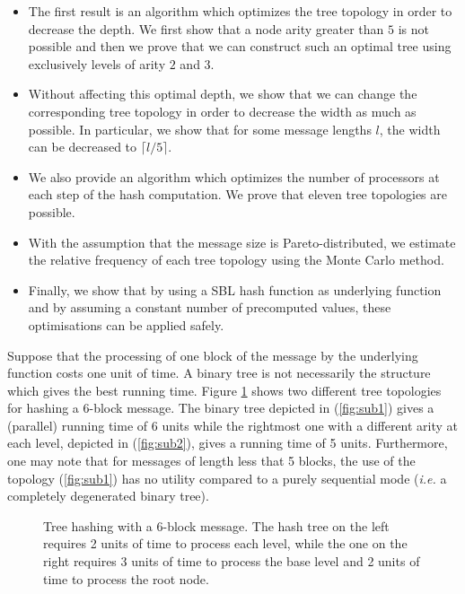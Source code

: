 \documentclass{llncs}
\begin{document}
\begin{itemize}
 \item The first result is an algorithm which optimizes 
the tree topology in order to decrease the depth. We first show that a node arity greater than $5$ is not possible and then we prove
that we can construct such an optimal tree using exclusively levels of arity $2$ and $3$.
 \item Without affecting this optimal depth, 
we show that we can change the corresponding tree topology in order to decrease the width as much as possible. 
In particular, we show that for some message lengths $l$, the width can be decreased to $\lceil l/5 \rceil$.
\item We also provide an algorithm which optimizes the number of processors 
 at each step of the hash computation. We prove that eleven tree topologies are possible.
 \item With the assumption that the message size is Pareto-distributed, we estimate the relative frequency of each tree topology 
 using the Monte Carlo method.
 \item Finally, we show that by using a SBL hash function as underlying function and by assuming a constant number of precomputed values, 
 these optimisations can be applied safely.
\end{itemize}



Suppose that the processing of one block of the message by the underlying function costs one unit of time. 
A binary tree is not necessarily the structure which gives the best running time. Figure \ref{Arbre_exemple} shows two different tree topologies for
hashing a 6-block message. 
The binary tree depicted in (\ref{fig:sub1}) gives a (parallel) running time of $6$ units while the rightmost one with a different arity 
at each level, depicted in (\ref{fig:sub2}), gives a running time of 5 units. Furthermore, one may note that for messages of length less that 5 blocks, 
the use of the topology (\ref{fig:sub1}) has no utility compared to a purely sequential mode (\textit{i.e.} a completely degenerated binary tree).


\begin{figure}[h]
\centering
{}
\qquad\qquad
{}
\caption{Tree hashing with a 6-block message. The hash tree on the left requires 2 units of time to process each level, while the one on the right requires 
3 units of time to process the base level and 2 units of time to process the root node.}
\label{Arbre_exemple}
\end{figure}
\end{document}
